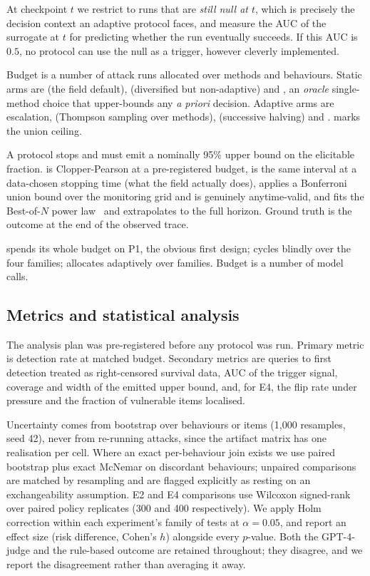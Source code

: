  At checkpoint $t$ we restrict to runs that are \emph{still null at
$t$}, which is precisely the decision context an adaptive protocol faces, and measure the AUC of
the surrogate at $t$ for predicting whether the run eventually succeeds. If this AUC is $0.5$, no
protocol can use the null as a trigger, however cleverly implemented.

 Budget is a number of attack runs allocated over methods and
behaviours. Static arms are \singlemethod (the field default), \roundrobin (diversified but
non-adaptive) and \bestsingle, an \emph{oracle} single-method choice that upper-bounds any
\textit{a priori} decision. Adaptive arms are escalation, \thompson (Thompson sampling over
methods), \succhalving (successive halving) and \escalthompson. \oracle marks the union ceiling.

 A protocol stops and must emit a nominally 95\% upper
bound on the elicitable fraction. \fixedcp is Clopper-Pearson at a pre-registered budget,
\adaptivecp is the same interval at a data-chosen stopping time (what the field actually does),
\unioncp applies a Bonferroni union bound over the monitoring grid and is genuinely anytime-valid,
and \extrapolative fits the Best-of-$N$ power law~\cite{hughes2024bon} and extrapolates to the full
horizon. Ground truth is the outcome at the end of the observed trace.

 \staticpone spends its whole budget on P1, the obvious first design;
\roundrobin cycles blindly over the four families; \thompson allocates adaptively over families.
Budget is a number of model calls.

\subsection{Metrics and statistical analysis}

The analysis plan was pre-registered before any protocol was run. Primary metric is detection rate
at matched budget. Secondary metrics are queries to first detection treated as right-censored
survival data, AUC of the trigger signal, coverage and width of the emitted upper bound, and, for
E4, the flip rate under pressure and the fraction of vulnerable items localised.

Uncertainty comes from bootstrap over behaviours or items (1{,}000 resamples, seed 42), never from
re-running attacks, since the artifact matrix has one realisation per cell. Where an exact
per-behaviour join exists we use paired bootstrap plus exact McNemar on discordant behaviours;
unpaired comparisons are matched by resampling and are flagged explicitly as resting on an
exchangeability assumption. E2 and E4 comparisons use Wilcoxon signed-rank over paired policy
replicates (300 and 400 respectively). We apply Holm correction within each experiment's family of
tests at $\alpha = 0.05$, and report an effect size (risk difference, Cohen's $h$) alongside every
$p$-value. Both the GPT-4-judge and the rule-based outcome are retained throughout; they disagree,
and we report the disagreement rather than averaging it away.

